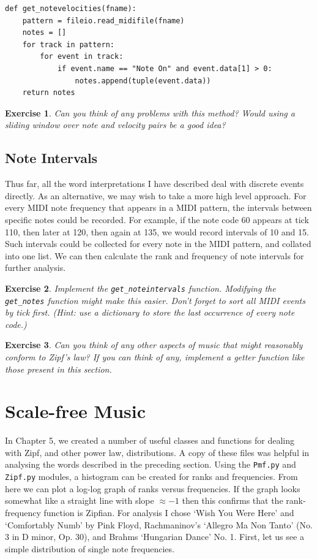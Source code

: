 \documentclass[10pt]{book}
\newtheorem{exercise}{Exercise}[chapter]
\begin{document}
\begin{verbatim}
def get_notevelocities(fname):
    pattern = fileio.read_midifile(fname)
    notes = []
    for track in pattern:
        for event in track:
            if event.name == "Note On" and event.data[1] > 0:
                notes.append(tuple(event.data))
    return notes
\end{verbatim}


\begin{exercise}
Can you think of any problems with this method? Would using a sliding window over note and velocity pairs be a good idea?
\end{exercise}



\subsection{Note Intervals}
Thus far, all the word interpretations I have described deal with discrete events directly. As an alternative, we may wish to take a more high level approach. For every MIDI note frequency that appears in a MIDI pattern, the intervals between specific notes could be recorded. For example, if the note code 60 appears at tick 110, then later at 120, then again at 135, we would record intervals of 10 and 15. Such intervals could be collected for every note in the MIDI pattern, and collated into one list. We can then calculate the rank and frequency of note intervals for further analysis.

\begin{exercise}
Implement the \texttt{get\_noteintervals} function. Modifying the \texttt{get\_notes} function might make this easier. Don't forget to sort all MIDI events by tick first. (Hint: use a dictionary to store the last occurrence of every note code.)
\end{exercise}

\begin{exercise}
Can you think of any other aspects of music that might reasonably conform to Zipf's law? If you can think of any, implement a getter function like those present in this section.
\end{exercise}




\section{Scale-free Music}
In Chapter 5, we created a number of useful classes and functions for dealing with Zipf, and other power law, distributions. A copy of these files was helpful in analysing the words described in the preceding section. Using the \texttt{Pmf.py} and \texttt{Zipf.py} modules, a histogram can be created for ranks and frequencies. From here we can plot a log-log graph of ranks versus frequencies. If the graph looks somewhat like a straight line with slope $\approx -1$ then this confirms that the rank-frequency function is Zipfian. For analysis I chose `Wish You Were Here' and `Comfortably Numb' by Pink Floyd, Rachmaninov's `Allegro Ma Non Tanto' (No. 3 in D minor, Op. 30), and Brahms `Hungarian Dance' No. 1. First, let us see a simple distribution of single note frequencies.
\end{document}
